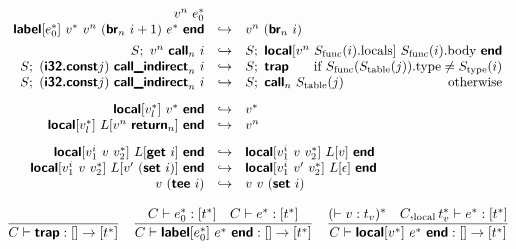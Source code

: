 \documentclass[a4paper]{scrartcl}
\newcommand\void[1]{}
\newcommand\f[1]{\ensuremath{\mathop{\mathrm{#1\null}}\nolimits}\xspace}
\newcommand\evalto{\hookrightarrow}
\newcommand\K[1]{\ensuremath{\textsf{#1}}}
\newcommand\KK[1]{\ensuremath{\K{\textbf{#1}}}}
\begin{document}
$$\begin{array}{rcl}
  v^n~e_0^\ast \\
\KK{label}[e_0^\ast]~v^\ast~v^n~(\KK{br}_n~i+1)~e^\ast~\KK{end} &\evalto&
  v^n~(\KK{br}_n~i) \\
[1ex]
S;~ v^n~\KK{call}_n~i &\evalto&
  S;~ \KK{local}[v^n~S_{\f{func}}(i).{\f{locals}}]~S_{\f{func}}(i).{\f{body}}~\KK{end} \\
S;~ (\KK{i32.const} j)~\KK{call\_indirect}_n~i &\evalto&
  S;~ \KK{trap}
  \hfill \text{if $S_{\f{func}}(S_{\f{table}}(j)).{\f{type}} \neq S_{\f{type}}(i)$} \\
S;~ (\KK{i32.const} j)~\KK{call\_indirect}_n~i &\evalto&
  S;~ \KK{call}_n~S_{\f{table}}(j)
  \hfill \text{otherwise} \\
[2ex]
\KK{local}[v_l^\ast]~v^\ast~\KK{end} &\evalto&
  v^\ast \\
\KK{local}[v_l^\ast]~L[v^n~\KK{return}_n]~\KK{end} &\evalto&
  v^n \\
[2ex]
\void{
S;~ (\KK{get}~i) &\evalto&
  S;~ S_{\f{local}}(i) \\
S;~ v~(\KK{set}~i) &\evalto&
  S,i=v;~ \epsilon \\
v~(\KK{tee}~i) &\evalto&
  v~v~(\KK{set}~i) \\
[1ex]
}
\KK{local}[v_1^i~v~v_2^\ast]~L[\KK{get}~i]~\KK{end} &\evalto&
  \KK{local}[v_1^i~v~v_2^\ast]~L[v]~\KK{end} \\
\KK{local}[v_1^i~v~v_2^\ast]~L[v'~(\KK{set}~i)]~\KK{end} &\evalto&
  \KK{local}[v_1^i~v'~v_2^\ast]~L[\epsilon]~\KK{end} \\
v~(\KK{tee}~i) &\evalto&
  v~v~(\KK{set}~i) \\
[1ex]
\end{array}
$$
%
$$
\frac{
}{
  C \vdash \KK{trap} : [] \to \poly{t^\ast}
}
\quad
\frac{
  C \vdash e_0^\ast : [t^\ast]\orbot
  \quad
  C \vdash e^\ast : [t^\ast]\orbot
}{
  C \vdash \KK{label}[e_0^\ast]~e^\ast~\KK{end} : [] \to [t^\ast]\orbot
}
\quad
\frac{
  (\vdash v : t_v)^\ast
  \quad
  C,_{\f{local}}t_v^\ast \vdash e^\ast : [t^\ast]\orbot
}{
  C \vdash \KK{local}[v^\ast]~e^\ast~\KK{end} : [] \to [t^\ast]\orbot
}
$$
\end{document}
